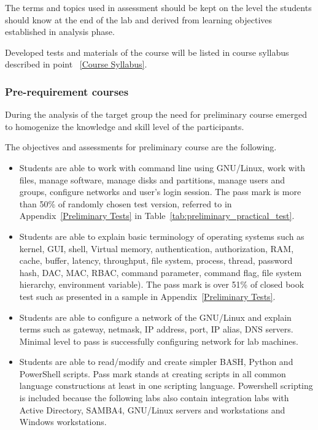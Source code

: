 The terms and topics used in assessment should be kept on the level the students should know at the end of the lab and derived from learning objectives established in analysis phase.

Developed tests and materials of the course will be listed in course syllabus described in point ~\ref{Course Syllabus}.

\subsubsection{Pre-requirement courses}

During the analysis of the target group the need for preliminary course emerged to homogenize the knowledge and skill level of the participants.

The objectives and assessments for preliminary course are the following.
\begin{itemize}
\item Students are able to work with command line using GNU/Linux, work with files, manage software, manage disks and partitions, manage users and groups, configure networks and user's login session.  The pass mark is more than 50\% of randomly chosen test version, referred to in   Appendix~\ref{Preliminary Tests} in Table~\ref{tab:preliminary_practical_test}.
\item Students are able to explain basic terminology of operating systems such as kernel, GUI, shell, Virtual memory, authentication, authorization, RAM, cache, buffer, latency, throughput, file system, process, thread, password hash, DAC, MAC, RBAC, command parameter, command flag, file system hierarchy, environment variable). The pass mark is over 51\% of closed book test such as presented in a sample in  Appendix~\ref{Preliminary Tests}.
\item Students are able to configure a network of the GNU/Linux and explain terms
such as gateway, netmask, IP address, port, IP alias, DNS servers. Minimal level
to pass is successfully configuring network for lab machines.
\item Students are able to read/modify and create simpler BASH, Python and PowerShell scripts. Pass mark stands at creating scripts in all common language constructions at least in one scripting language. Powershell scripting is included because the following labs also contain integration labs with Active Directory, SAMBA4, GNU/Linux servers and workstations and Windows workstations.
\end{itemize}

